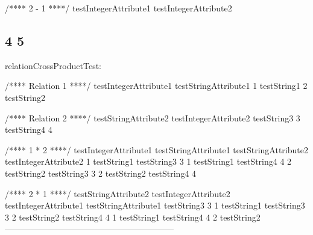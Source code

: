 \begin{DoxyPre}{\ttfamily /**** 2 - 1 ****/
testIntegerAttribute1  testIntegerAttribute2  
\subsection*{4                      5                      
}}\end{DoxyPre}



\begin{DoxyPre}{\ttfamily }\end{DoxyPre}



\begin{DoxyPre}{\ttfamily relationCrossProductTest:}\end{DoxyPre}



\begin{DoxyPre}{\ttfamily /**** Relation 1 ****/
testIntegerAttribute1  testStringAttribute1  
1                      testString1           
2                      testString2}\end{DoxyPre}



\begin{DoxyPre}{\ttfamily /**** Relation 2 ****/
testStringAttribute2  testIntegerAttribute2  
testString3           3                      
testString4           4}\end{DoxyPre}



\begin{DoxyPre}{\ttfamily /**** 1 * 2 ****/
testIntegerAttribute1  testStringAttribute1  testStringAttribute2  testIntegerAttribute2  
1                      testString1           testString3           3                      
1                      testString1           testString4           4                      
2                      testString2           testString3           3                      
2                      testString2           testString4           4}\end{DoxyPre}



\begin{DoxyPre}{\ttfamily /**** 2 * 1 ****/
testStringAttribute2  testIntegerAttribute2  testIntegerAttribute1  testStringAttribute1  
testString3           3                      1                      testString1           
testString3           3                      2                      testString2           
testString4           4                      1                      testString1           
testString4           4                      2                      testString2           
------------------------------------------------------------}\end{DoxyPre}
 